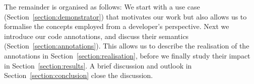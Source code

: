 The remainder is organised as follows:
We start with a use case (Section~\ref{section:demonstrator}) that motivates our work but also allows us to formalise the concepts employed from a developer's perspective. Next we introduce our code annotations, and discuss their semantics (Section~\ref{section:annotations}). This allows us to describe the realisation of the annotations in Section~\ref{section:realisation}, before we finally study their impact in Section~\ref{section:results}.
A brief discussion and outlook in Section~\ref{section:conclusion} close the discussion.
